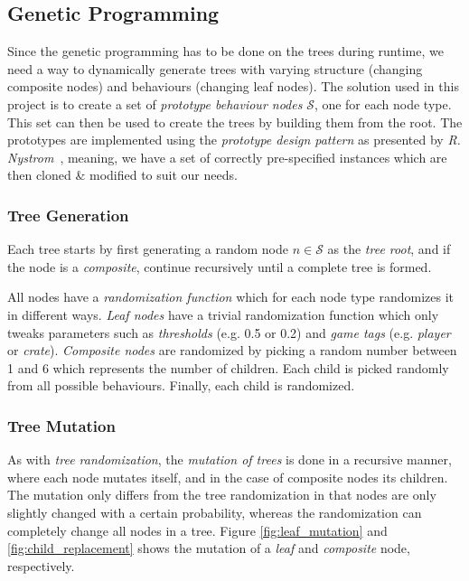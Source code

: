 \documentclass[a4paper, twocolumn]{article}
\begin{document}
        \subsection{Genetic Programming} \label{sec:genetic_programming_implementation}

        Since the genetic programming has to be done on the trees during runtime, we need a way to dynamically generate trees with varying structure (changing composite nodes) and behaviours (changing leaf nodes). The solution used in this project is to create a set of \textit{prototype behaviour nodes} \(\mathcal{S}\), one for each node type. This set can then be used to create the trees by building them from the root. The prototypes are implemented using the \textit{prototype design pattern} as presented by \textit{R. Nystrom}~\cite{nystrom2014game}, meaning, we have a set of correctly pre-specified instances which are then cloned \& modified to suit our needs.

        \subsubsection*{Tree Generation}

        Each tree starts by first generating a random node \(n \in \mathcal{S}\) as the \emph{tree root}, and if the node is a \textit{composite}, continue recursively until a complete tree is formed.

        All nodes have a \textit{randomization function} which for each node type randomizes it in different ways. \emph{Leaf nodes} have a trivial randomization function which only tweaks parameters such as \emph{thresholds} (e.g. 0.5 or 0.2) and \emph{game tags} (e.g. \emph{player} or \emph{crate}). \emph{Composite nodes} are randomized by picking a random number between 1 and 6 which represents the number of children. Each child is picked randomly from all possible behaviours. Finally, each child is randomized.

        \subsubsection*{Tree Mutation}

        As with \textit{tree randomization}, the \emph{mutation of trees} is done in a recursive manner, where each node mutates itself, and in the case of composite nodes its children. The mutation only differs from the tree randomization in that nodes are only slightly changed with a certain probability, whereas the randomization can completely change all nodes in a tree. Figure \cref{fig:leaf_mutation} and \cref{fig:child_replacement} shows the mutation of a \emph{leaf} and \emph{composite} node, respectively. 
\end{document}
